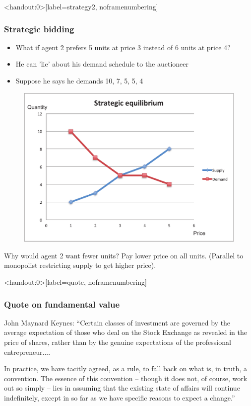 \documentclass[english,10pt]{beamer}
\theoremstyle{definition}
\begin{document}
\begin{frame}<handout:0>[label=strategy2, noframenumbering]
\frametitle{Strategic bidding}
\begin{itemize}
\item What if agent 2 prefers 5 units at price 3 instead of 6 units at price 4?
\item He can 'lie' about his demand schedule to the auctioneer
\item Suppose he says he demands 10, 7, 5, 5, 4
\end{itemize}
\begin{figure}
\includegraphics[width=.4\paperwidth]{pics/Image_Strategic2}
\end{figure}

Why would agent 2 want fewer units? Pay lower price on all units. (Parallel to monopolist restricting supply to get higher price). \hyperlink{main2}{}
\end{frame}

\begin{frame}<handout:0>[label=quote, noframenumbering]
\frametitle{Quote on fundamental value}
John Maynard Keynes:
``Certain classes of investment are governed by the average expectation of those who deal on the Stock Exchange as revealed in the price of shares, rather than by the genuine expectations of the professional entrepreneur.... 

\quad

In practice, we have tacitly agreed, as a rule, to fall back on what is, in truth, a convention. The essence of this convention -- though it does not, of course, work out so simply -- lies in assuming that the existing state of affairs will continue indefinitely, except in so far as we have specific reasons to expect a change.''
\hyperlink{main4}{}

\end{frame}
\end{document}
